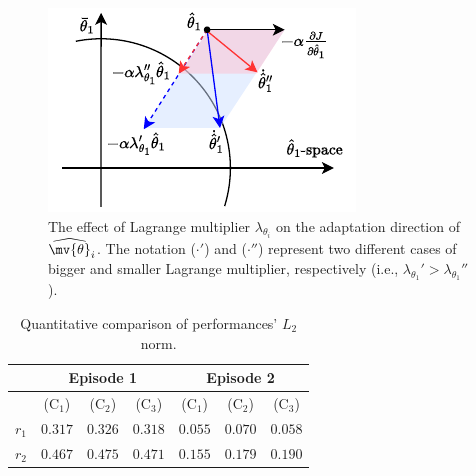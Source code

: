 \documentclass[final,5p,times,twocolumn,authoryear]{elsarticle}
\begin{document}
\begin{figure}[!t]
	\centering
	\includegraphics[width=0.6\linewidth]{
		src/figures/lambda_effect.drawio.pdf
		}
	\caption{
		The effect of Lagrange multiplier $\lambda_{\theta_i}$ on the adaptation direction of $\widehat{ \mv{\theta}}_i$.
		The notation ($\cdot'$) and ($\cdot''$) represent two different cases of bigger and smaller Lagrange multiplier, respectively (i.e., $\lambda_{\theta_1}' > \lambda_{\theta_1}''$).
	}
	\label{fig:lambda_effect}
\end{figure}

\begin{table}[!t]
    \renewcommand{\arraystretch}{1.3}
    \caption{Quantitative comparison of performances' $L_2$ norm.}
    \centering
    \begin{tabular}{c c c c c c c}
    \hline
		& \multicolumn{3}{c}{\textbf{Episode 1}}  & \multicolumn{3}{c}{\textbf{Episode 2}} \\
    \hline
	\hline 
		& (C$_1$) & (C$_2$) & (C$_3$) & (C$_1$) & (C$_2$) & (C$_3$) \\
	\hline
		$r_1$ & $0.317$ & $0.326$ & $0.318$ & $0.055$ & $0.070$ & $0.058$ \\
	\hline
        $r_2$ & $0.467$ & $0.475$ & $0.471$ & $0.155$ & $0.179$ & $0.190$ \\
	\hline
    \end{tabular}
    \label{tab:sim:L2}
\end{table}
\end{document}
